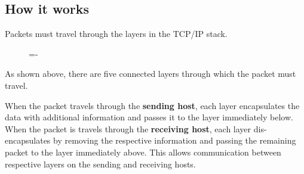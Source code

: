 \documentclass[a4paper]{systems-software}
\begin{document}
\subsection*{How it works}

Packets must travel through the layers in the TCP/IP stack.

\begin{figure}[H]
	\lineskip=-\fboxrule
\end{figure}

As shown above, there are five connected layers through which the packet must travel.

When the packet travels through the \textbf{sending host}, each layer encapsulates the data with additional information and passes it to the layer immediately below. When the packet is travels through the \textbf{receiving host}, each layer dis-encapsulates by removing the respective information and passing the remaining packet to the layer immediately above. This allows communication between respective layers on the sending and receiving hosts.
\end{document}
